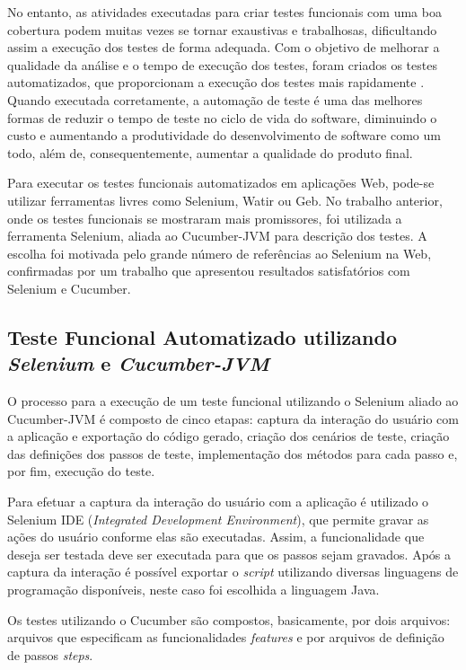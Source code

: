 \documentclass[12pt]{article}
\begin{document}
No entanto, as atividades executadas para criar testes funcionais com uma boa cobertura podem muitas vezes se tornar exaustivas e trabalhosas, dificultando assim a execução dos testes de forma adequada. Com o objetivo de melhorar a qualidade da análise e o tempo de execução dos testes, foram criados os testes automatizados, que proporcionam a execução dos testes mais rapidamente \cite{fantinato2005autotest}. Quando executada corretamente, a automação de teste é uma das melhores formas de reduzir o tempo de teste no ciclo de vida do software, diminuindo o custo e aumentando a produtividade do desenvolvimento de software como um todo, além de, consequentemente, aumentar a qualidade do produto final.

Para executar os testes funcionais automatizados em aplicações Web, pode-se utilizar ferramentas livres como Selenium\cite{selenium}, Watir\cite{watir} ou Geb\cite{geb}. No trabalho anterior\cite{sbqs2015}, onde os testes funcionais se mostraram mais promissores, foi utilizada a ferramenta Selenium, aliada ao Cucumber-JVM\cite{cucumber} para descrição dos testes. A escolha foi motivada pelo grande número de referências ao Selenium na Web, confirmadas por um trabalho que apresentou resultados satisfatórios com Selenium e Cucumber\cite{pannutest,sbqs2013}.

\subsection{Teste Funcional Automatizado utilizando \emph{Selenium} e \emph{Cucumber-JVM}}
O processo para a execução de um teste funcional utilizando o Selenium aliado ao Cucumber-JVM é composto de cinco etapas: captura da interação do usuário com a aplicação e exportação do código gerado, criação dos cenários de teste, criação das definições dos passos de teste, implementação dos métodos para cada passo e, por fim, execução do teste.

Para efetuar a captura da interação do usuário com a aplicação é utilizado o Selenium IDE (\emph{Integrated Development Environment}), que permite gravar as ações do usuário conforme elas são executadas. Assim, a funcionalidade que deseja ser testada deve ser executada para que os passos sejam gravados. Após a captura da interação é possível exportar o \emph{script} utilizando diversas linguagens de programação disponíveis, neste caso foi escolhida a linguagem Java.

Os testes utilizando o Cucumber são compostos, basicamente, por dois arquivos: arquivos que especificam as funcionalidades \emph{features} e por arquivos de definição de passos \emph{steps}. 
\end{document}

